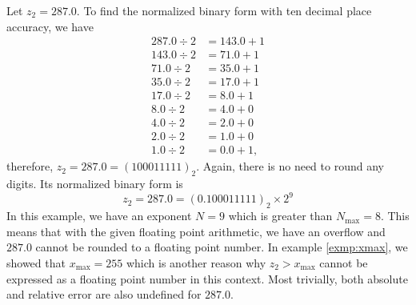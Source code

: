 \begin{exmp}
    Let \(z_2 = 287.0\). To find the normalized binary form with ten decimal place accuracy, we have
    \begin{align*}
        287.0 \div 2 &= 143.0 + 1 \\
        143.0 \div 2 &= 71.0 + 1 \\
        71.0 \div 2 &= 35.0 + 1 \\
        35.0 \div 2 &= 17.0 + 1 \\
        17.0 \div 2 &= 8.0 + 1 \\
        8.0 \div 2 &= 4.0 + 0 \\
        4.0 \div 2 &= 2.0 + 0 \\
        2.0 \div 2 &= 1.0 + 0 \\
        1.0 \div 2 &= 0.0 + 1 \text{,}
    \end{align*}
    therefore, \(z_2 = 287.0 = (100011111)_2\). Again, there is no need to round any digits. Its normalized binary form is
    \begin{equation*}
        z_2 = 287.0 = (0.100011111)_2 \times 2^9
    \end{equation*}
    In this example, we have an exponent \(N = 9\) which is greater than \(N_{\text{max}} = 8\). This means that with the given floating point arithmetic, we have an overflow and \(287.0\) cannot be rounded to a floating point number. In example \ref{exmp:xmax}, we showed that \(x_{\text{max}} = 255\) which is another reason why \(z_2 > x_{\text{max}}\) cannot be expressed as a floating point number in this context.
    Most trivially, both absolute and relative error are also undefined for \(287.0\).
\end{exmp}
%
%
